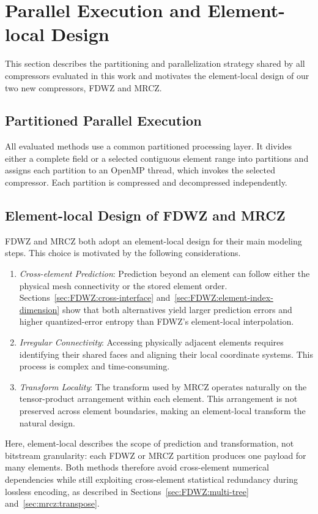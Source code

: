 \section{Parallel Execution and Element-local Design}\label{sec:design overview}

This section describes the partitioning and parallelization strategy shared by all compressors evaluated in this work and motivates the element-local design of our two new compressors, FDWZ and MRCZ.

\subsection{Partitioned Parallel Execution}

All evaluated methods use a common partitioned processing layer. It divides either a complete field or a selected contiguous element range into partitions and assigns each partition to an OpenMP thread, which invokes the selected compressor. Each partition is compressed and decompressed independently.

\subsection{Element-local Design of FDWZ and MRCZ}

FDWZ and MRCZ both adopt an element-local design for their main modeling steps. This choice is motivated by the following considerations.

\begin{enumerate}
\item \textit{Cross-element Prediction}: Prediction beyond an element can follow either the physical mesh connectivity or the stored element order. Sections~\ref{sec:FDWZ:cross-interface} and~\ref{sec:FDWZ:element-index-dimension} show that both alternatives yield larger prediction errors and higher quantized-error entropy than FDWZ's element-local interpolation.
\item \textit{Irregular Connectivity}: Accessing physically adjacent elements requires identifying their shared faces and aligning their local coordinate systems. This process is complex and time-consuming.
\item \textit{Transform Locality}: The transform used by MRCZ operates naturally on the tensor-product arrangement within each element. This arrangement is not preserved across element boundaries, making an element-local transform the natural design.
\end{enumerate}

Here, element-local describes the scope of prediction and transformation, not bitstream granularity: each FDWZ or MRCZ partition produces one payload for many elements. Both methods therefore avoid cross-element numerical dependencies while still exploiting cross-element statistical redundancy during lossless encoding, as described in Sections~\ref{sec:FDWZ:multi-tree} and~\ref{sec:mrcz:transpose}.

